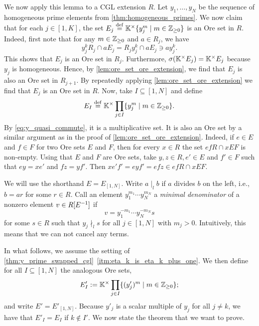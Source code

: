 We now apply this lemma to a CGL extension $R$. Let $y_1, \dots, y_N$ be the sequence
of homogeneous prime elements from \cref{thm:homogeneous_primes}. We now claim that for
each $j \in [1, K]$, the set $E_j \overset{\mathrm{def}}{=} \mathbb{K}^\times\{y_j^{m} \mid m \in \mathbb{Z}_{\geq
		0}\}$ is an Ore set in $R$. Indeed, first note that for any $m \in \mathbb{Z}_{\geq 0}$ and
$a \in R_j$, we have
\begin{equation*}
	y_j^k R_j \cap a E_j = R_j y_j^k \cap  a E_j \ni a y_j^k.
\end{equation*}
%
This shows that $E_j$ is an Ore set in $R_j$. Furthermore, $\sigma(\mathbb{K}^\times E_j) =
	\mathbb{K}^\times E_j$ because $y_j$ is homogeneous. Hence, by
\cref{lem:ore_set_ore_extension}, we find that $E_j$ is also an Ore set in $R_{j + 1}$.
By repeatedly applying \cref{lem:ore_set_ore_extension} we find that $E_j$ is an Ore
set in $R$. Now, take $I \subseteq [1, N]$ and define
\begin{equation*}
	E_I \overset{\mathrm{def}}{=} \mathbb{K}^\times \prod_{j \in I}\{y_j^m \mid m \in \mathbb{Z}_{\geq 0}\}.
\end{equation*}
%
By \cref{eq:y_quasi_commute}, it is a multiplicative set. It is also an Ore set by a
similar argument as in the proof of \cref{lem:ore_set_ore_extension}. Indeed, if $e \in
	E$ and $f \in F$ for two Ore sets $E$ and $F$, then for every $x \in R$ the set $ef R
	\cap x E F$ is non-empty. Using that $E$ and $F$ are Ore sets, take $y, z \in R, e' \in
	E$ and $f' \in F$ such that $ey = xe'$ and $fz = yf'$. Then $xe'f' = eyf' = efz \in efR
	\cap xEF$.

We will use the shorthand $E = E_{[1,N]}$. Write $a \mid_l b$ if $a$ divides $b$ on the left, i.e., $b = ar$ for some $r \in R$. Call
an element $y_1^{m_1}\cdots y_N^{m_N}$ a \emph{minimal denominator} of a nonzero element $v\in R[E^{-1}]$ if
\begin{equation*}
	v = y_1^{-m_1}\cdots y_N^{-m_N} s
\end{equation*}
%
for some $s \in R$ such that $y_j \nmid_l s$ for all $j\in [1,N]$ with $m_j > 0$.
Intuitively, this means that we can not cancel any terms.

In what follows, we assume the setting of
\cref{thm:y_prime_swapped_cgl}~\ref*{itm:eta_k_is_eta_k_plus_one}. We then define for
all $I \subseteq [1, N]$ the analogous Ore sets,
\begin{equation*}
	E'_{I} := \mathbb{K}^\times \prod_{j \in I}\{(y'_j)^m \mid m \in \mathbb{Z}_{\geq 0}\};
\end{equation*}
%
and write $E' = E'_{[1, N]}$. Because $y'_j$ is a scalar multiple of $y_j$ for all $j
	\neq k$, we have that $E'_I = E_I$ if $k \notin I'$. We now state the theorem that we
want to prove.

